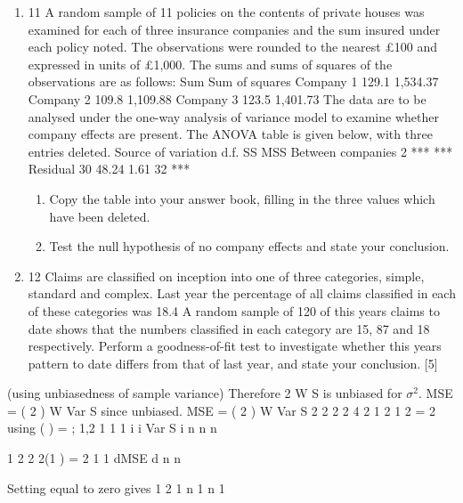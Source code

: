 \documentclass[a4paper,12pt]{article}
\begin{document}
\begin{enumerate}
\item 11 A random sample of 11 policies on the contents of private houses was examined
for each of three insurance companies and the sum insured under each policy
noted. The observations were rounded to the nearest £100 and expressed in units
of £1,000.
The sums and sums of squares of the observations are as follows:
Sum Sum of squares
Company 1 129.1 1,534.37
Company 2 109.8 1,109.88
Company 3 123.5 1,401.73
The data are to be analysed under the one-way analysis of variance model to
examine whether company effects are present.
The ANOVA table is given below, with three entries deleted.
Source of variation d.f. SS MSS
Between companies 2 *** ***
Residual 30 48.24 1.61
32 ***
\begin{enumerate}
\item Copy the table into your answer book, filling in the three values which
have been deleted. 
\item Test the null hypothesis of no company effects and state your conclusion.

\end{enumerate}


\item 12 Claims are classified on inception into one of three categories, simple,
standard and complex. Last year the percentage of all claims classified in
each of these categories was 18.4%
A random sample of 120 of this years claims to date shows that the numbers
classified in each category are 15, 87 and 18 respectively.
Perform a goodness-of-fit test to investigate whether this years pattern to date
differs from that of last year, and state your conclusion. [5]
\end{enumerate}
\newpage
(using unbiasedness of sample variance)
Therefore 2
W S is unbiased for $\sigma^2$. MSE = ( 2 ) W Var S since unbiased.
MSE = ( 2 ) W Var S 2 2 2 2
4 2
1 2
1 2
= 2 using ( ) = ; 1,2
1 1 1 i
i
Var S i
n n n

1 2
2 2(1 )
= 2
1 1
dMSE
d n n


Setting equal to zero gives
1 2
1
n 1 n 1
\end{document}

